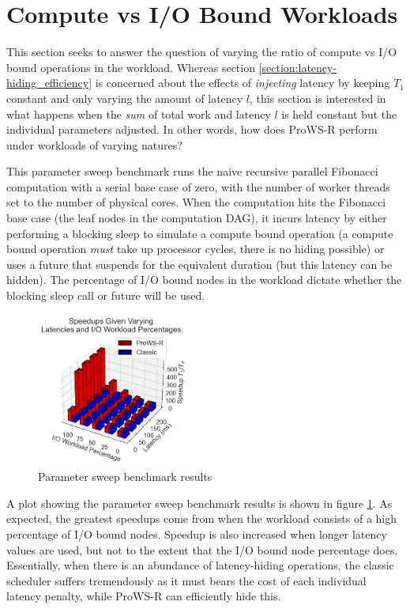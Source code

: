 \documentclass[bsc,frontabs,singlespacing,parskip,deptreport,normalheadings]{infthesis}
\begin{document}
\section{Compute vs I/O Bound Workloads}
\label{section:compute_vs_i/o_bound_workloads}

This section seeks to answer the question of varying the ratio of compute vs I/O
bound operations in the workload. Whereas section
\ref{section:latency-hiding_efficiency} is concerned about the effects of
\textit{injecting} latency by keeping \(T_1\) constant and only varying the
amount of latency \(l\), this section is interested in what
happens when the \textit{sum} of total work and latency \(l\) is held constant
but the individual parameters adjusted. In other words, how does ProWS-R perform
under workloads of varying natures?

This parameter sweep benchmark runs the naive recursive parallel Fibonacci
computation with a serial base case of zero, with the number of worker threads
set to the number of physical cores. When the computation hits the Fibonacci
base case (the leaf nodes in the computation DAG), it incurs latency by either
performing a blocking sleep to simulate a compute bound operation (a compute
bound operation \textit{must} take up processor cycles, there is no hiding
possible) or uses a future that suspends for the equivalent duration (but this
latency can be hidden). The percentage of I/O bound nodes in the workload
dictate whether the blocking sleep call or future will be used.

\begin{figure}[ht]
    \centering
    \includegraphics[width=0.45\textwidth]{figures/param_sweep_plot.png}
    \caption{Parameter sweep benchmark results}
    \label{fig:param_sweep}
\end{figure}

A plot showing the parameter sweep benchmark results is shown in figure
\ref{fig:param_sweep}. As expected, the greatest speedups come from when the
workload consists of a high percentage of I/O bound nodes. Speedup is also
increased when longer latency values are used, but not to the extent that the
I/O bound node percentage does. Essentially, when there is an abundance of
latency-hiding operations, the classic scheduler suffers tremendously as it must
bears the cost of each individual latency penalty, while ProWS-R can efficiently
hide this.
\end{document}
